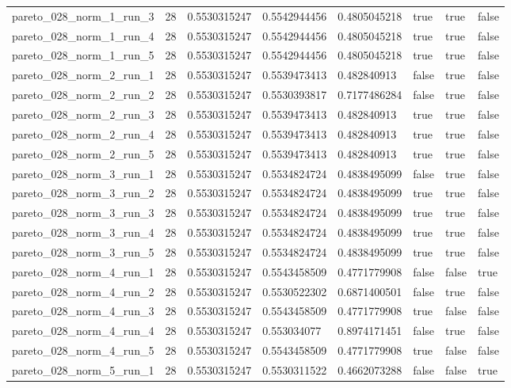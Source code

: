 \begin{tabular}{@{}llllllll@{}}
pareto\_028\_norm\_1\_run\_3 & 28 & 0.5530315247 & 0.5542944456 & 0.4805045218 & true & true & false \\
pareto\_028\_norm\_1\_run\_4 & 28 & 0.5530315247 & 0.5542944456 & 0.4805045218 & true & true & false \\
pareto\_028\_norm\_1\_run\_5 & 28 & 0.5530315247 & 0.5542944456 & 0.4805045218 & true & true & false \\
pareto\_028\_norm\_2\_run\_1 & 28 & 0.5530315247 & 0.5539473413 & 0.482840913 & false & true & false \\
pareto\_028\_norm\_2\_run\_2 & 28 & 0.5530315247 & 0.5530393817 & 0.7177486284 & false & true & false \\
pareto\_028\_norm\_2\_run\_3 & 28 & 0.5530315247 & 0.5539473413 & 0.482840913 & true & true & false \\
pareto\_028\_norm\_2\_run\_4 & 28 & 0.5530315247 & 0.5539473413 & 0.482840913 & true & true & false \\
pareto\_028\_norm\_2\_run\_5 & 28 & 0.5530315247 & 0.5539473413 & 0.482840913 & true & true & false \\
pareto\_028\_norm\_3\_run\_1 & 28 & 0.5530315247 & 0.5534824724 & 0.4838495099 & false & true & false \\
pareto\_028\_norm\_3\_run\_2 & 28 & 0.5530315247 & 0.5534824724 & 0.4838495099 & true & true & false \\
pareto\_028\_norm\_3\_run\_3 & 28 & 0.5530315247 & 0.5534824724 & 0.4838495099 & true & true & false \\
pareto\_028\_norm\_3\_run\_4 & 28 & 0.5530315247 & 0.5534824724 & 0.4838495099 & true & true & false \\
pareto\_028\_norm\_3\_run\_5 & 28 & 0.5530315247 & 0.5534824724 & 0.4838495099 & true & true & false \\
pareto\_028\_norm\_4\_run\_1 & 28 & 0.5530315247 & 0.5543458509 & 0.4771779908 & false & false & true \\
pareto\_028\_norm\_4\_run\_2 & 28 & 0.5530315247 & 0.5530522302 & 0.6871400501 & false & true & false \\
pareto\_028\_norm\_4\_run\_3 & 28 & 0.5530315247 & 0.5543458509 & 0.4771779908 & true & false & false \\
pareto\_028\_norm\_4\_run\_4 & 28 & 0.5530315247 & 0.553034077 & 0.8974171451 & false & true & false \\
pareto\_028\_norm\_4\_run\_5 & 28 & 0.5530315247 & 0.5543458509 & 0.4771779908 & true & false & false \\
pareto\_028\_norm\_5\_run\_1 & 28 & 0.5530315247 & 0.5530311522 & 0.4662073288 & false & false & true \\

\end{tabular}
